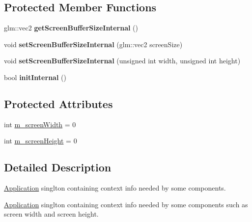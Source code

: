 \subsection*{Protected Member Functions}
\begin{DoxyCompactItemize}
\item 
\mbox{\label{classce_1_1core_1_1_application_ab6561ce429b01ee5b5b3687f502eb6f9}} 
glm\+::vec2 {\bfseries get\+Screen\+Buffer\+Size\+Internal} ()
\item 
\mbox{\label{classce_1_1core_1_1_application_a1b2bf718bbf98e3b95169aca5077ea80}} 
void {\bfseries set\+Screen\+Buffer\+Size\+Internal} (glm\+::vec2 screen\+Size)
\item 
\mbox{\label{classce_1_1core_1_1_application_af9a89c06b7d8e1a76a8685a67ee53689}} 
void {\bfseries set\+Screen\+Buffer\+Size\+Internal} (unsigned int width, unsigned int height)
\item 
\mbox{\label{classce_1_1core_1_1_application_a26e6df9acf8018f9fe321869753ab072}} 
bool {\bfseries init\+Internal} ()
\end{DoxyCompactItemize}
\subsection*{Protected Attributes}
\begin{DoxyCompactItemize}
\item 
int \hyperlink{classce_1_1core_1_1_application_ad840abf73bfce6617f76afcfe41b6a37}{m\+\_\+screen\+Width} = 0
\item 
int \hyperlink{classce_1_1core_1_1_application_a159cdcc30a4443b5e7f585ed7a00fe7d}{m\+\_\+screen\+Height} = 0
\end{DoxyCompactItemize}


\subsection{Detailed Description}
\hyperlink{classce_1_1core_1_1_application}{Application} singlton containing context info needed by some components. 

\hyperlink{classce_1_1core_1_1_application}{Application} singlton containing context info needed by some components such as screen width and screen height. 

